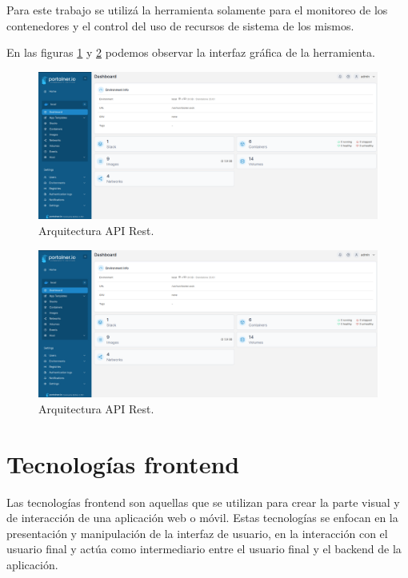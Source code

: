 Para este trabajo se utilizá la herramienta solamente para el monitoreo de los contenedores y el control del uso de recursos de sistema de los mismos.

En las figuras \ref{fig:portainer1} y \ref{fig:portainer2} podemos observar la interfaz gráfica de la herramienta.

\begin{figure}[H]
	\centering
	\includegraphics[scale=.20]{./Figures/portainer-admin-1.png}
	\caption{Arquitectura API Rest.}
	\label{fig:portainer1}
\end{figure}

\begin{figure}[H]
	\centering
	\includegraphics[scale=.20]{./Figures/portainer-admin-1.png}
	\caption{Arquitectura API Rest.}
	\label{fig:portainer2}
\end{figure}


\section{Tecnologías frontend}
\label{sec:frontend}

Las tecnologías frontend son aquellas que se utilizan para crear la parte visual y de interacción de una aplicación web o móvil. Estas tecnologías se enfocan en la presentación y manipulación de la interfaz de usuario, en la interacción con el usuario final y actúa como intermediario entre el usuario final y el backend de la aplicación.

